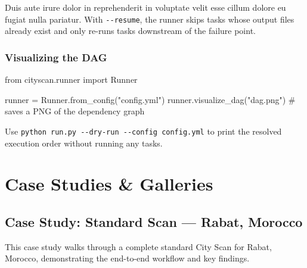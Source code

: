\documentclass[
  letterpaper,
  DIV=11,
  numbers=noendperiod]{scrreprt}
\newenvironment{Shaded}{\begin{snugshade}}{\end{snugshade}}
\newcommand{\CommentTok}[1]{\textcolor[rgb]{0.37,0.37,0.37}{#1}}
\newcommand{\ImportTok}[1]{\textcolor[rgb]{0.00,0.46,0.62}{#1}}
\newcommand{\NormalTok}[1]{\textcolor[rgb]{0.00,0.23,0.31}{#1}}
\newcommand{\OperatorTok}[1]{\textcolor[rgb]{0.37,0.37,0.37}{#1}}
\newcommand{\StringTok}[1]{\textcolor[rgb]{0.13,0.47,0.30}{#1}}
\begin{document}
Duis aute irure dolor in reprehenderit in voluptate velit esse cillum
dolore eu fugiat nulla pariatur. With \texttt{-\/-resume}, the runner
skips tasks whose output files already exist and only re-runs tasks
downstream of the failure point.

\section{Visualizing the DAG}\label{visualizing-the-dag}

\begin{Shaded}
\begin{Highlighting}[]
\ImportTok{from}\NormalTok{ cityscan.runner }\ImportTok{import}\NormalTok{ Runner}

\NormalTok{runner }\OperatorTok{=}\NormalTok{ Runner.from\_config(}\StringTok{"config.yml"}\NormalTok{)}
\NormalTok{runner.visualize\_dag(}\StringTok{"dag.png"}\NormalTok{)   }\CommentTok{\# saves a PNG of the dependency graph}
\end{Highlighting}
\end{Shaded}

\begin{tcolorbox}[enhanced jigsaw, arc=.35mm, bottomrule=.15mm, bottomtitle=1mm, breakable, colback=white, colbacktitle=quarto-callout-tip-color!10!white, colframe=quarto-callout-tip-color-frame, coltitle=black, left=2mm, leftrule=.75mm, opacityback=0, opacitybacktitle=0.6, rightrule=.15mm, title=\textcolor{quarto-callout-tip-color}{\faLightbulb}\hspace{0.5em}{Tip}, titlerule=0mm, toprule=.15mm, toptitle=1mm]

Use \texttt{python\ run.py\ -\/-dry-run\ -\/-config\ config.yml} to
print the resolved execution order without running any tasks.

\end{tcolorbox}

\part{Case Studies \& Galleries}

\chapter{Case Study: Standard Scan --- Rabat,
Morocco}\label{case-study-standard-scan-rabat-morocco}

This case study walks through a complete standard City Scan for Rabat,
Morocco, demonstrating the end-to-end workflow and key findings.
\end{document}

